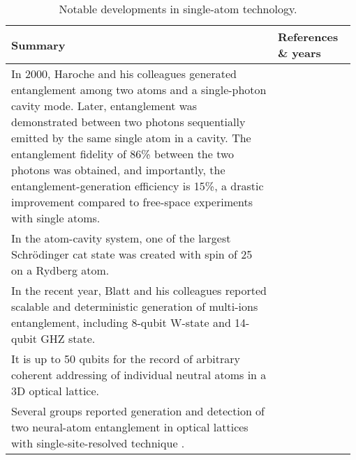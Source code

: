 \begin{table*}[!htbp]
	\begin{tabular}{|p{0.755\linewidth}|p{0.22\linewidth}|}
		\hline
		Summary & References \& years \\
		\hline \hline		
		In 2000, Haroche and his colleagues generated entanglement among two atoms and a single-photon cavity mode. Later, entanglement was demonstrated between two photons sequentially emitted by the same single atom in a cavity. The entanglement fidelity of 86\% between the two photons was obtained, and importantly, the entanglement-generation efficiency is 15\%, a drastic improvement compared to free-space experiments with single atoms. & \cite{bib:rauschenbeutel2000step, bib:wilk2007single, bib:blinov2004observation} \\
		\hline
		In the atom-cavity system, one of the largest Schr{\"o}dinger cat state was created with spin of 25 on a Rydberg atom. & \cite{bib:facon2016sensitive} \\
		\hline
		In the recent year, Blatt and his colleagues reported scalable and deterministic generation of multi-ions entanglement, including 8-qubit W-state and 14-qubit GHZ state. & \cite{bib:haffner2005scalable, bib:monz2011}\\
		\hline
		It is up to 50 qubits for the record of arbitrary coherent addressing of individual neutral atoms in a 3D optical lattice. & \cite{bib:wang2015coherent} \\
		\hline		
		Several groups reported generation and detection of two neural-atom entanglement in optical lattices with single-site-resolved technique . & \cite{bib:kaufman2015entangling, bib:islam2015measuring, bib:dai2016generation}\\
		\hline
	\end{tabular}
	\captionspacetab \caption{Notable developments in single-atom technology.} \label{tab:single_atoms}
\end{table*}

